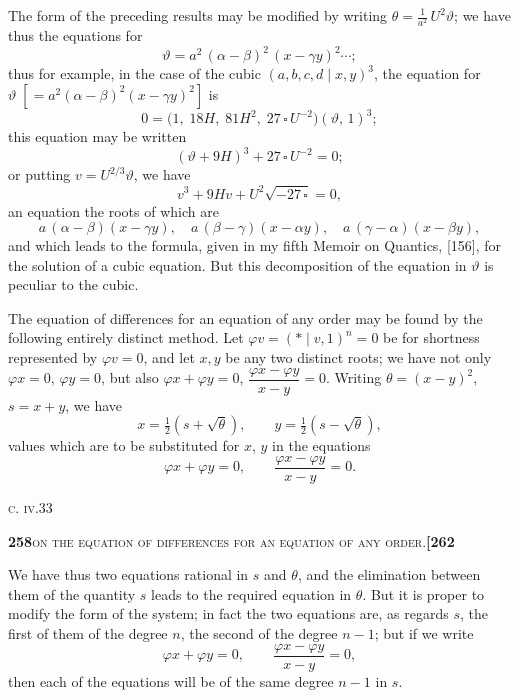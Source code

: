 \documentclass[11pt]{article}
\newcommand{\Cdel}{\mid}
\begin{document}
\medskip

\noindent The form of the preceding results may be modified by writing $\theta = \tfrac{1}{a^2}\,U^2\vartheta$; we have thus the equations for
\[
  \vartheta = a^2\,(\alpha - \beta)^2\,(x - \gamma y)^2 \cdots ;
\]
thus for example, in the case of the cubic $(a, b, c, d \Cdel x, y)^3$, the equation for $\vartheta\;[= a^2 (\alpha - \beta)^2 (x - \gamma y)^2]$ is
\[
  0 = \bigl(1,\; 18 H,\; 81 H^2,\; 27\,\square\,U^{-2}\bigr)(\vartheta,\,1)^3;
\]
this equation may be written
\[
  (\vartheta + 9 H)^3 + 27\,\square\, U^{-2} = 0;
\]
or putting $v = U^{2/3}\vartheta$, we have
\[
  v^3 + 9 H v + U^2\sqrt{-27\,\square} = 0,
\]
an equation the roots of which are
\[
  a\,(\alpha - \beta)(x - \gamma y),\quad a\,(\beta - \gamma)(x - \alpha y),\quad a\,(\gamma - \alpha)(x - \beta y),
\]
and which leads to the formula, given in my fifth Memoir on Quantics, [156], for the solution of a cubic equation. But this decomposition of the equation in $\vartheta$ is peculiar to the cubic.

\medskip

\noindent The equation of differences for an equation of any order may be found by the following entirely distinct method. Let $\varphi v = (\ast \Cdel v, 1)^n = 0$ be for shortness represented by $\varphi v = 0$, and let $x, y$ be any two distinct roots; we have not only $\varphi x = 0$, $\varphi y = 0$, but also $\varphi x + \varphi y = 0$, $\dfrac{\varphi x - \varphi y}{x - y} = 0$. Writing $\theta = (x - y)^2$, $s = x + y$, we have
\[
  x = \tfrac{1}{2}(s + \sqrt{\theta}),\qquad y = \tfrac{1}{2}(s - \sqrt{\theta}),
\]
values which are to be substituted for $x$, $y$ in the equations
\[
  \varphi x + \varphi y = 0,\qquad \frac{\varphi x - \varphi y}{x - y} = 0.
\]

\medskip

\noindent\textsc{c. iv.}\hfill 33

\newpage
\setcounter{page}{258}

\noindent\textbf{258}\hfill\textsc{on the equation of differences for an equation of any order.}\hfill\textbf{[262}

\medskip

\noindent We have thus two equations rational in $s$ and $\theta$, and the elimination between them of the quantity $s$ leads to the required equation in $\theta$. But it is proper to modify the form of the system; in fact the two equations are, as regards $s$, the first of them of the degree $n$, the second of the degree $n - 1$; but if we write
\[
   \varphi x + \varphi y = 0,\qquad \frac{\varphi x - \varphi y}{x - y} = 0,
\]
then each of the equations will be of the same degree $n - 1$ in $s$.
\end{document}
